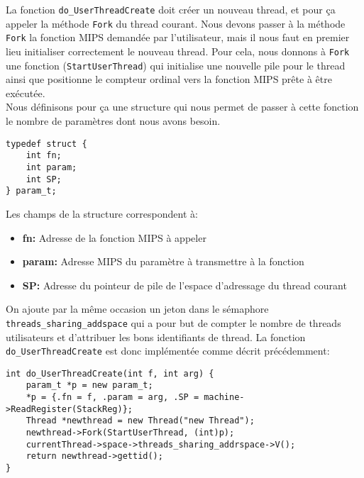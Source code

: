 \documentclass{report}
\begin{document}
La fonction \texttt{do\_UserThreadCreate} doit créer un nouveau thread, et pour ça appeler la méthode \texttt{Fork} du thread courant. Nous devons passer à la méthode \texttt{Fork} la fonction MIPS demandée par l'utilisateur, mais il nous faut en premier lieu initialiser correctement le nouveau thread. Pour cela, nous donnons à \texttt{Fork} une fonction (\texttt{StartUserThread}) qui initialise une nouvelle pile pour le thread ainsi que positionne le compteur ordinal vers la fonction MIPS prête à être exécutée.\\
Nous définisons pour ça une structure qui nous permet de passer à cette fonction le nombre de paramètres dont nous avons besoin.
\begin{verbatim}
typedef struct {
    int fn;
    int param;
    int SP;
} param_t;
\end{verbatim}
Les champs de la structure correspondent à:
\begin{itemize}
\item \textbf{fn:} Adresse de la fonction MIPS à appeler
\item \textbf{param:} Adresse MIPS du paramètre à transmettre à la fonction
\item \textbf{SP:} Adresse du pointeur de pile de l'espace d'adressage du thread courant
\end{itemize}
On ajoute par la même occasion un jeton dans le sémaphore \texttt{threads\_sharing\_addspace} qui a pour but de compter le nombre de threads utilisateurs et d'attribuer les bons identifiants de thread.
La fonction \texttt{do\_UserThreadCreate} est donc implémentée comme décrit précédemment:
\begin{verbatim}
int do_UserThreadCreate(int f, int arg) {
    param_t *p = new param_t;
    *p = {.fn = f, .param = arg, .SP = machine->ReadRegister(StackReg)};
    Thread *newthread = new Thread("new Thread");
    newthread->Fork(StartUserThread, (int)p);
    currentThread->space->threads_sharing_addrspace->V();
    return newthread->gettid();
}
\end{verbatim}
\end{document}
